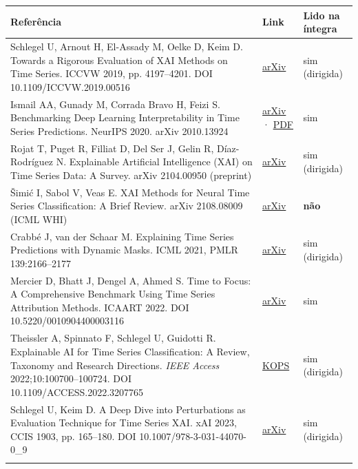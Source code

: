 \documentclass[11pt,a4paper]{article}
\begin{document}
{\scriptsize\setlength{\tabcolsep}{3pt}
\begin{xltabular}{\linewidth}{>{\raggedright\arraybackslash}X>{\raggedright\arraybackslash}X>{\raggedright\arraybackslash}X}
\toprule
\textbf{Referência} & \textbf{Link} & \textbf{Lido na íntegra} \\
\midrule
\endhead
Schlegel U, Arnout H, El-Assady M, Oelke D, Keim D. Towards a Rigorous Evaluation of XAI Methods on Time Series. ICCVW 2019, pp. 4197–4201. DOI 10.1109/ICCVW.2019.00516 & \href{https://arxiv.org/abs/1909.07082}{arXiv} & sim (dirigida) \\ \addlinespace[1pt]
Ismail AA, Gunady M, Corrada Bravo H, Feizi S. Benchmarking Deep Learning Interpretability in Time Series Predictions. NeurIPS 2020. arXiv 2010.13924 & \href{https://arxiv.org/abs/2010.13924}{arXiv} · \href{https://proceedings.neurips.cc/paper/2020/file/47a3893cc405396a5c30d91320572d6d-Paper.pdf}{PDF} & sim \\ \addlinespace[1pt]
Rojat T, Puget R, Filliat D, Del Ser J, Gelin R, Díaz-Rodríguez N. Explainable Artificial Intelligence (XAI) on Time Series Data: A Survey. arXiv 2104.00950 (preprint) & \href{https://arxiv.org/abs/2104.00950}{arXiv} & sim (dirigida) \\ \addlinespace[1pt]
Šimić I, Sabol V, Veas E. XAI Methods for Neural Time Series Classification: A Brief Review. arXiv 2108.08009 (ICML WHI) & \href{https://arxiv.org/abs/2108.08009}{arXiv} & \textbf{não} \\ \addlinespace[1pt]
Crabbé J, van der Schaar M. Explaining Time Series Predictions with Dynamic Masks. ICML 2021, PMLR 139:2166–2177 & \href{https://arxiv.org/abs/2106.05303}{arXiv} & sim (dirigida) \\ \addlinespace[1pt]
Mercier D, Bhatt J, Dengel A, Ahmed S. Time to Focus: A Comprehensive Benchmark Using Time Series Attribution Methods. ICAART 2022. DOI 10.5220/0010904400003116 & \href{https://arxiv.org/abs/2202.03759}{arXiv} & sim \\ \addlinespace[1pt]
Theissler A, Spinnato F, Schlegel U, Guidotti R. Explainable AI for Time Series Classification: A Review, Taxonomy and Research Directions. \textit{IEEE Access} 2022;10:100700–100724. DOI 10.1109/ACCESS.2022.3207765 & \href{https://kops.uni-konstanz.de/handle/123456789/59034}{KOPS} & sim (dirigida) \\ \addlinespace[1pt]
Schlegel U, Keim D. A Deep Dive into Perturbations as Evaluation Technique for Time Series XAI. xAI 2023, CCIS 1903, pp. 165–180. DOI 10.1007/978-3-031-44070-0\_9 & \href{https://arxiv.org/abs/2307.05104}{arXiv} & sim (dirigida) \\ \addlinespace[1pt]

\end{xltabular}}
\end{document}
